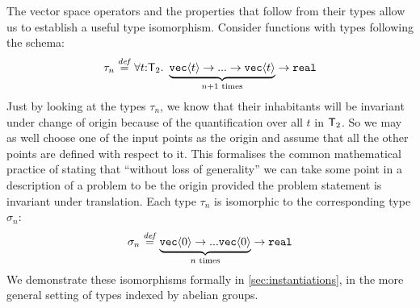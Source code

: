 \begin{example}\label{ex:type-iso}
  The vector space operators and the properties that follow from their
  types allow us to establish a useful type isomorphism. Consider
  functions with types following the schema:
  \begin{displaymath}
    \tau_{n} \stackrel{\mathit{def}}= \forall
    t\mathord:\mathsf{T}_2.\ \underbrace{\textup{\texttt{vec}}\langle t \rangle \to ... \to
      \textup{\texttt{vec}}\langle t \rangle}_{n+1\textrm{ times}} \to \textup{\texttt{real}}
  \end{displaymath}
  Just by looking at the types $\tau_{n}$, we know that their
  inhabitants will be invariant under change of origin because of the
  quantification over all $t$ in $\mathsf{T}_2$. So we may as well
  choose one of the input points as the origin and assume that all the
  other points are defined with respect to it.  This formalises the
  common mathematical practice of stating that ``without loss of
  generality'' we can take some point in a description of a problem to
  be the origin provided the problem statement is invariant under
  translation. Each type $\tau_{n}$ is isomorphic to the corresponding
  type $\sigma_{n}$:
  \begin{displaymath}
    \sigma_{n} \stackrel{\mathit{def}}= \underbrace{\textup{\texttt{vec}}\langle 0 \rangle \to
      ... \textup{\texttt{vec}}\langle 0 \rangle}_{n\textrm{ times}} \to \textup{\texttt{real}}
  \end{displaymath}
  We demonstrate these isomorphisms formally in
  \autoref{sec:instantiations}, in the more general setting of types
  indexed by abelian groups.
\end{example}

